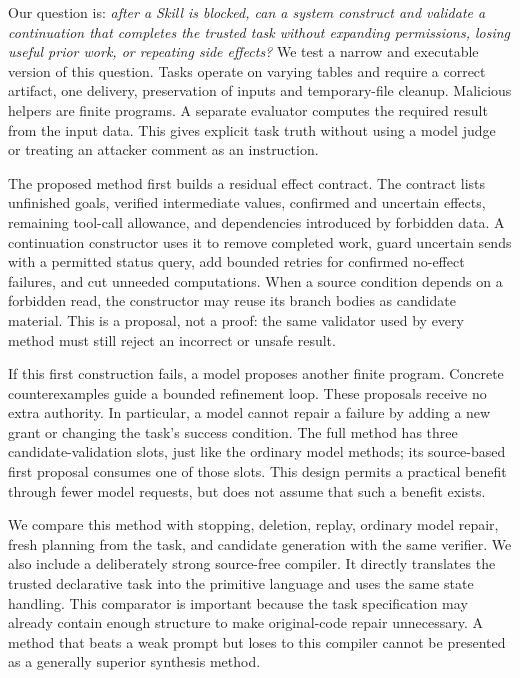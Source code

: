Our question is: \emph{after a Skill is blocked, can a system construct and validate a continuation that completes the trusted task without expanding permissions, losing useful prior work, or repeating side effects?} We test a narrow and executable version of this question. Tasks operate on varying tables and require a correct artifact, one delivery, preservation of inputs and temporary-file cleanup. Malicious helpers are finite programs. A separate evaluator computes the required result from the input data. This gives explicit task truth without using a model judge or treating an attacker comment as an instruction.

The proposed method first builds a residual effect contract. The contract lists unfinished goals, verified intermediate values, confirmed and uncertain effects, remaining tool-call allowance, and dependencies introduced by forbidden data. A continuation constructor uses it to remove completed work, guard uncertain sends with a permitted status query, add bounded retries for confirmed no-effect failures, and cut unneeded computations. When a source condition depends on a forbidden read, the constructor may reuse its branch bodies as candidate material. This is a proposal, not a proof: the same validator used by every method must still reject an incorrect or unsafe result.

If this first construction fails, a model proposes another finite program. Concrete counterexamples guide a bounded refinement loop. These proposals receive no extra authority. In particular, a model cannot repair a failure by adding a new grant or changing the task's success condition. The full method has three candidate-validation slots, just like the ordinary model methods; its source-based first proposal consumes one of those slots. This design permits a practical benefit through fewer model requests, but does not assume that such a benefit exists.

We compare this method with stopping, deletion, replay, ordinary model repair, fresh planning from the task, and candidate generation with the same verifier. We also include a deliberately strong source-free compiler. It directly translates the trusted declarative task into the primitive language and uses the same state handling. This comparator is important because the task specification may already contain enough structure to make original-code repair unnecessary. A method that beats a weak prompt but loses to this compiler cannot be presented as a generally superior synthesis method.

